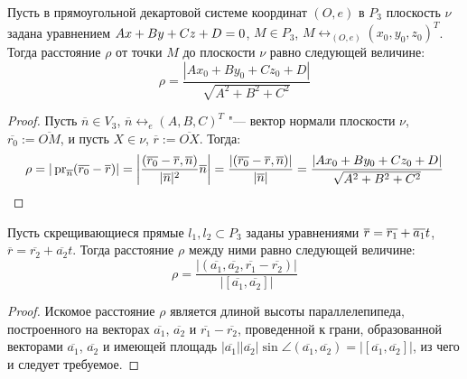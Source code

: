     \begin{proposition}
    	Пусть в прямоугольной декартовой системе координат $(O, e)$ в $P_3$ плоскость $\nu$ задана уравнением $Ax\hm{+}By+Cz+D=0$, $M \in P_3$, $M \leftrightarrow_{(O, e)} (x_0, y_0, z_0)^T$. Тогда расстояние $\rho$ от точки $M$ до плоскости $\nu$ равно следующей величине:
    	\[\rho = \frac{|Ax_0 + By_0 + Cz_0+D|}{\sqrt{A^2 + B^2 + C^2}}\]
    \end{proposition}
    
    \begin{proof}
    	Пусть $\overline{n} \in V_3$, $\overline n \leftrightarrow_{e} (A, B, C)^T$ "--- вектор нормали плоскости $\nu$, $\overline{r_0} := \overline{OM}$, и пусть $X \in \nu$, $\overline{r} := \overline{OX}$. Тогда:
    	\[\rho = |\operatorname{pr}_{\overline{n}}(\overline{r_0} - \overline{r})|
    	=
    	\left|\frac{(\overline{r_0} - \overline{r}, \overline{n})}{|\overline{n}|^2}\overline{n}\right|
    	= 
    	\frac{|(\overline{r_0} - \overline{r}, \overline{n})|}{|\overline{n}|}
    	=
    	\frac{|Ax_0 + By_0 + Cz_0+D|}{\sqrt{A^2 + B^2+C^2}}\qedhere\]
    \end{proof}
    
    \begin{proposition}
    	Пусть скрещивающиеся прямые $l_1, l_2 \subset P_3$ заданы уравнениями $\overline{r} = \overline{r_1} \hm{+} \overline{a_1}t$, $\overline{r} = \overline{r_2} + \overline{a_2}t$. Тогда расстояние $\rho$ между ними равно следующей величине:
    	\[\rho = \frac{|(\overline{a_1}, \overline{a_2}, \overline{r_1} - \overline{r_2})|}{|[\overline{a_1}, \overline{a_2}]|}\]
    \end{proposition}
    
    \begin{proof}
    	Искомое расстояние $\rho$ является длиной высоты параллелепипеда, построенного на векторах $\overline{a_1}$, $\overline{a_2}$ и $\overline{r_1} - \overline{r_2}$, проведенной к грани, образованной векторами $\overline{a_1}$, $\overline{a_2}$ и имеющей площадь $|\overline{a_1}||\overline{a_2}|\sin\angle(\overline{a_1}, \overline{a_2}) = |[\overline{a_1}, \overline{a_2}]|$, из чего и следует требуемое.
    \end{proof}